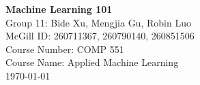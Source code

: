 \begin{titlepage}%
\begin{center}


\HRule %

\textbf{Machine Learning 101} \\










{Group 11: Bide Xu, Mengjia Gu, Robin Luo }\\
{McGill ID: 260711367, 260790140, 260851506}\\
{Course Number: COMP 551}\\
{Course Name: Applied Machine Learning}\\
{\today}


\end{center}
\end{titlepage} 